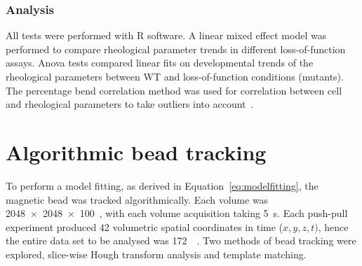 \subsubsection{Analysis}

All tests were performed with R software.
A linear mixed effect model was performed to compare rheological parameter trends in different loss-of-function assays.
Anova tests compared linear fits on developmental trends of the rheological parameters between \gls{WT} and loss-of-function conditions (mutants).
The percentage bend correlation method was used for correlation between cell and rheological parameters to take outliers into account~\cite{wilcoxPercentageBendCorrelation1994}. %

%
%

\section{Algorithmic bead tracking}

To perform a model fitting, as derived in Equation~\eqref{eq:modelfitting}, the magnetic bead was tracked algorithmically.
Each volume was \SI{2048 x 2048 x 100}{}~, with each volume acquisition taking \SI{5}{\second}.
Each push-pull experiment produced 42 volumetric spatial coordinates in time (\(x,y,z,t)\), hence the entire data set to be analysed was \SI{172}{\giga\byte}.
Two methods of bead tracking were explored, slice-wise Hough transform analysis and template matching.
%


